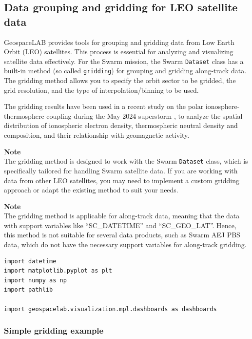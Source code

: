 \subsection{Data grouping and gridding for LEO satellite data}

GeospaceLAB provides tools for grouping and gridding data from Low Earth Orbit (LEO) satellites. This process is essential for analyzing and visualizing satellite data effectively. For the Swarm mission, the Swarm \texttt{Dataset} class has a built-in method (so called \texttt{gridding}) for grouping and gridding along-track data. The gridding method allows you to specify the orbit sector to be gridded, the grid resolution, and the type of interpolation/binning to be used.

The gridding results have been used in a recent study on the polar ionosphere-thermosphere coupling during the May 2024 superstorm  \citep{cai2026ionosphere}, to analyze the spatial distribution of ionospheric electron density, thermospheric neutral density and composition, and their relationship with geomagnetic activity.

\begin{framed}
\textbf{Note}\\
The gridding method is designed to work with the Swarm \texttt{Dataset} class, which is specifically tailored for handling Swarm satellite data. If you are working with data from other LEO satellites, you may need to implement a custom gridding approach or adapt the existing method to suit your needs.
\end{framed}

\begin{framed}
\textbf{Note}\\
The gridding method is applicable for along-track data, meaning that the data with support variables like ``SC\_DATETIME'' and ``SC\_GEO\_LAT''. Hence, this method is not suitable for several data products, such as Swarm AEJ PBS data, which do not have the necessary support variables for along-track gridding.
\end{framed}

\begin{verbatim}
import datetime
import matplotlib.pyplot as plt
import numpy as np
import pathlib

import geospacelab.visualization.mpl.dashboards as dashboards
\end{verbatim}

\subsubsection{Simple gridding example}

